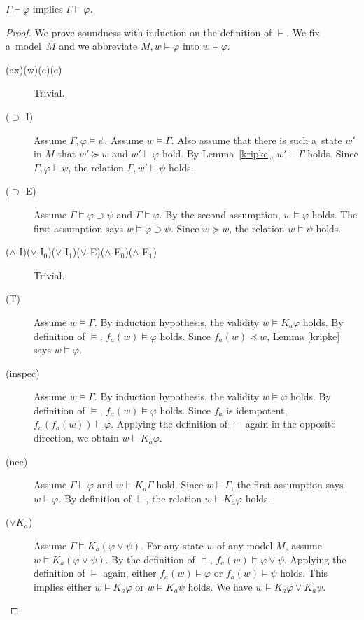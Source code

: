 \begin{theorem}[Soundness]
\label{soundness}
$\Gamma\vdash\varphi$ implies $\Gamma\models\varphi$.
\end{theorem}
\begin{proof}
We prove soundness with induction on the definition of $\vdash$. 
 We fix a~model~$M$ and we abbreviate $M,w \models
 \varphi$ into $w\models \varphi$.
\begin{description}
 \item[(ax)(w)(c)(e)] Trivial.
 \item[($\supset$-I)] Assume $\Gamma,\varphi\models\psi$.
	    Assume $w\models \Gamma$. Also assume that there is such a~state $w'$
	    in $M$ that $w'\succeq w$ and
	    $w'\models\varphi$ hold. 
	    By Lemma~\ref{kripke}, $ w'\models\Gamma$ holds.
	    Since $\Gamma,\varphi\models\psi$, the relation $\Gamma, w'\models
	    \psi$ holds.
 \item[($\supset$-E)]
	    Assume $\Gamma\models\varphi\supset\psi$ and $\Gamma\models\varphi$.
	    By the second assumption, $w\models \varphi$ holds.
	    The first assumption says $w\models\varphi\supset\psi$.
	    Since $w\succeq w$, the relation $w\models\psi$ holds.
 \item[($\wedge$-I)($\vee$-I$_0$)($\vee$-I$_1$)($\vee$-E)($\wedge$-E$_0$)($\wedge$-E$_1$)]
	    Trivial.
 \item[(T)] Assume $w\models \Gamma$. By induction hypothesis,
	    the validity $w\models K_a \varphi$ holds.
	    By definition of $\models$, 
	    $ f_a(w)\models\varphi$ holds.
	    Since $f_a(w)\preceq w$, Lemma \ref{kripke} says
	    $w\models \varphi$.
 \item[(inspec)]
	    Assume $w\models \Gamma$.
	    By induction hypothesis, the validity
	    $w\models\varphi$ holds. By definition of $\models$,
	    $f_a(w)\models\varphi$ holds.
	    Since $f_a$ is idempotent, 
	    $f_a(f_a(w))\models\varphi$.
	    Applying the definition of $\models$ again in the opposite direction,
	    we obtain
	    $w\models{K_a}\varphi$.
 \item[(nec)] 
	    Assume $\Gamma\models\varphi$ and
	    $ w\models{K_a}\Gamma$ hold.
	    Since $w\models\Gamma$, the first assumption says $w\models \varphi$.
	    By definition of $\models$, the relation
	    $w\models{K_a} \varphi$ holds.
 \item[($\vee{K_a}$)]
	    Assume $\Gamma\models {K_a}(\varphi\vee\psi)$.
	    For any state $w$ of any model $M$, assume
	    $w\models{K_a}(\varphi\vee\psi)$.
	    By the definition of $\models$,
	    $f_a(w)\models\varphi\vee\psi$.
	    Applying the definition of $\models$ again,
	    either $f_a(w)\models\varphi$ or $f_a(w)\models\psi$ holds.
	    This implies either $w\models{K_a}\varphi$ or $w\models{K_a}\psi$
	    holds.
	    We have $w\models{K_a}\varphi\vee{K_a}\psi$. 
\end{description}
\end{proof}



